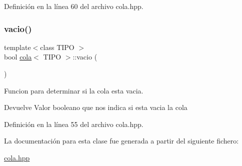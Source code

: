 Definición en la línea 60 del archivo cola.\+hpp.

\mbox{\label{classcola_a2af9a71dd856a907f446a1e396d83e5b}} 
\subsubsection{\texorpdfstring{vacio()}{vacio()}}
{\footnotesize\ttfamily template$<$class T\+I\+PO $>$ \\
bool \hyperlink{classcola}{cola}$<$ T\+I\+PO $>$\+::vacio (\begin{DoxyParamCaption}{ }\end{DoxyParamCaption})}



Funcion para determinar si la cola esta vacia. 

\begin{DoxyReturn}{Devuelve}
Valor booleano que nos indica si esta vacia la cola 
\end{DoxyReturn}


Definición en la línea 55 del archivo cola.\+hpp.



La documentación para esta clase fue generada a partir del siguiente fichero\+:\begin{DoxyCompactItemize}
\item 
\hyperlink{cola_8hpp}{cola.\+hpp}\end{DoxyCompactItemize}
